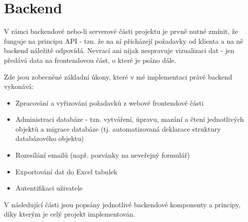 \section{Backend}
	V rámci backendové nebo-li serverové části projektu je prvně nutné zmínit, že funguje na principu API - tzn. že na ní přicházejí požadavky od klienta a na ně backend náležitě odpovídá. Nevrací ani nijak nespravuje vizualizaci dat - jen předává data na frontendovou část, o které je psáno dále.
	
	Zde jsou zobecněné základní úkony, které v mé implementaci právě backend vykonává:
	
	\begin{itemize}
		\item Zpracování a vyřizování požadavků z webové frontendové části
		\item Administraci databáze - tzn. vytváření, úpravu, mazání a čtení jednotlivých objektů a migrace databáze (tj. automatizovaná deklarace struktury databázového objektu)
		\item Rozesílání emailů (např. pozvánky na neveřejný formulář)
		\item Exportování dat do Excel tabulek
		\item Autentifikaci uživatele
	\end{itemize}
	 
	V následující části jsou popsány jednotlivé backendové komponenty a principy, díky kterým je celý projekt implementován.
	
